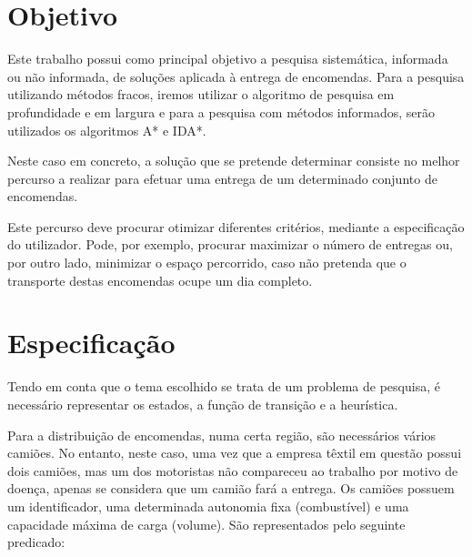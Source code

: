 \documentclass[a4paper]{article}
\begin{document}
\tableofcontents



\newpage

\section{Objetivo}

Este trabalho possui como principal objetivo a pesquisa sistemática, informada ou não informada, de soluções aplicada à entrega de encomendas. Para a pesquisa utilizando métodos fracos, iremos utilizar o algoritmo de pesquisa em profundidade e em largura e para a pesquisa com métodos informados, serão utilizados os algoritmos A* e IDA*. 

Neste caso em concreto, a solução que se pretende determinar consiste no melhor percurso a realizar para efetuar uma entrega de um determinado conjunto de encomendas.

Este percurso deve procurar otimizar diferentes critérios, mediante a especificação do utilizador. Pode, por exemplo, procurar maximizar o número de entregas ou, por outro lado, minimizar o espaço percorrido, caso não pretenda que o transporte destas encomendas ocupe um dia completo.

\newpage

\section{Especificação}

Tendo em conta que o tema escolhido se trata de um problema de pesquisa, é necessário representar os estados, a função de transição e a heurística.

Para a distribuição de encomendas, numa certa região, são necessários vários camiões. No entanto, neste caso, uma vez que a empresa têxtil em questão possui dois camiões, mas um dos motoristas não compareceu ao trabalho por motivo de doença, apenas se considera que um camião fará a entrega. Os camiões possuem um identificador, uma determinada autonomia fixa (combustível) e uma capacidade máxima de carga (volume). São representados pelo seguinte predicado:
\end{document}
